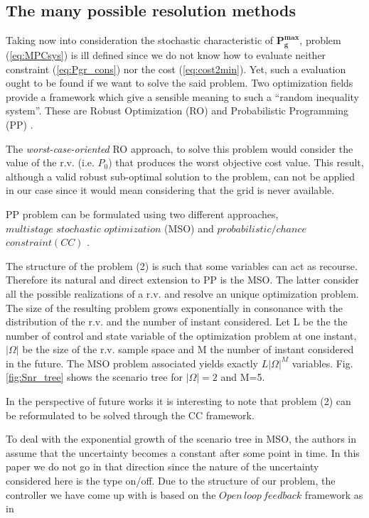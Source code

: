 \documentclass[conference]{IEEEtran}
\begin{document}
\subsection{The many possible resolution methods}
Taking now into consideration the stochastic characteristic of $\textbf{P}_\textbf{g}^{\textbf{max}}$, problem (\ref{eq:MPCsys}) is ill defined since we do not know how to evaluate  neither constraint (\ref{eq:Pgr_cons}) nor the cost (\ref{eq:cost2min}). Yet, such a evaluation ought to be found if we want to solve the said problem. Two optimization fields  provide a framework which give a sensible meaning to such a ``random inequality system”. These are Robust Optimization (RO) \cite{BenTal2009} and Probabilistic Programming (PP) \cite{Ankopa1995}.

The \textit{worst-case-oriented} RO approach, to solve this problem would consider the value of the r.v. (i.e. $P_0$) that produces the worst objective cost value. This result, although a valid robust sub-optimal solution to the problem, can not be applied in our case since it would mean considering that the grid is never available.
 
 PP problem can be formulated using two different approaches, $multistage\, \, stochastic $ $optimization$ (MSO) \cite{Ankopa1995} and  $probabilistic/chance$  $constraint (CC)$ \cite{AChWCo1958,AChWCo1959,AnPre1970,Tsentai1988}. 
 
 The structure of the problem (2) is such that some variables can act as recourse. Therefore its natural and direct extension to PP is the MSO. The latter consider all the possible realizations of a r.v. and resolve an unique optimization problem. The size of the resulting problem grows exponentially in consonance with the distribution of the r.v. and the number of instant considered. Let L be the the number of control and state variable of the optimization problem at one instant, $|\Omega|$ be the size of the r.v. sample space and M the number of instant considered in the future. The MSO problem associated yields exactly  $L|\Omega|^M$ variables. Fig. \ref{fig:Snr_tree} shows   the scenario tree for $|\Omega|= 2$ and M=5. 

In the perspective of future works it is interesting to note that problem (2) can be reformulated to be solved through the CC framework.
  
To deal with the exponential growth of the scenario tree in MSO, the authors in \cite{SLuAJo2014} assume that the uncertainty becomes a constant after some point in time.  In this paper we do not go in that direction since the nature of the uncertainty considered here is the type on/off. Due to the structure of our problem, the controller we have come up with is based on the $Open\, loop\, feedback$ framework as in \cite{YBarRSi1969} 
 
\end{document}
